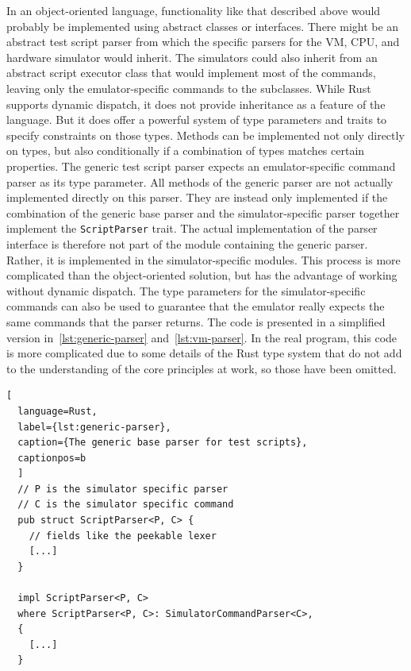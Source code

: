 In an object-oriented language, functionality like that described above would probably be implemented using abstract classes or interfaces.
There might be an abstract test script parser from which the specific parsers for the VM, CPU, and hardware simulator would inherit.
The simulators could also inherit from an abstract script executor class that would implement most of the commands, leaving only the emulator-specific commands to the subclasses.
While Rust supports dynamic dispatch, it does not provide inheritance as a feature of the language.
But it does offer a powerful system of type parameters and traits to specify constraints on those types.
Methods can be implemented not only directly on types, but also conditionally if a combination of types matches certain properties.
The generic test script parser expects an emulator-specific command parser as its type parameter.
All methods of the generic parser are not actually implemented directly on this parser.
They are instead only implemented if the combination of the generic base parser and the simulator-specific parser together implement the \verb+ScriptParser+ trait.
The actual implementation of the parser interface is therefore not part of the module containing the generic parser.
Rather, it is implemented in the simulator-specific modules.
This process is more complicated than the object-oriented solution, but has the advantage of working without dynamic dispatch.
The type parameters for the simulator-specific commands can also be used to guarantee that the emulator really expects the same commands that the parser returns.
The code is presented in a simplified version in~\cref{lst:generic-parser} and~\cref{lst:vm-parser}.
In the real program, this code is more complicated due to some details of the Rust type system that do not add to the understanding of the core principles at work, so those have been omitted.

\begin{lstlisting}[
  language=Rust,
  label={lst:generic-parser},
  caption={The generic base parser for test scripts},
  captionpos=b
  ]
  // P is the simulator specific parser
  // C is the simulator specific command
  pub struct ScriptParser<P, C> {
    // fields like the peekable lexer
    [...]
  }

  impl ScriptParser<P, C>
  where ScriptParser<P, C>: SimulatorCommandParser<C>,
  {
    [...]
  }
\end{lstlisting}

